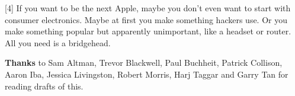 [4] If you want to be the next Apple, maybe you don't even want
                  to start with consumer electronics. Maybe at first you make
                  something hackers use. Or you make something popular but
                  apparently unimportant, like a headset or router. All you need
                  is a bridgehead.


                  \textbf{Thanks} to Sam Altman, Trevor Blackwell, Paul Buchheit,
                  Patrick Collison, Aaron Iba, Jessica Livingston, Robert
                  Morris, Harj Taggar and Garry Tan for reading drafts of
                  this.


              
            
          
            
              
                


                  
              
            
          
